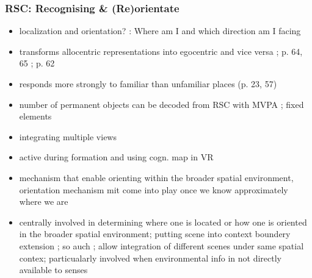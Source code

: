 \documentclass[10pt,a4paper,twocolumn]{article}
\begin{document}
\subsubsection*{RSC: Recognising \& (Re)orientate}
\begin{itemize}
	\item localization and orientation? \citet{epstein_2014_landmark-based_wayfinding}:
	Where am I and which direction am I facing
	\item transforms allocentric representations into egocentric and vice versa
	\citep{vann_2009_what_does_retrospenical_cortex}; p. 64, 65 \citet{epstein_2008_parahippocampal_retrospinal_navigation};
	p. 62 \citet{epstein_2014_landmark-based_wayfinding}
	\item responds more strongly to familiar than unfamiliar places (p. 23,
	57)
	\item number of permanent objects can be decoded from RSC with MVPA \citep{auger_2013_assessing_retrosplenial_navigators};
	fixed elements \citep{marchette_2014_anchoring_neural_compass}
	\item integrating multiple views \citep{park_2010_refreshing_visual_scenes}
	\item active during formation and using cogn. map in VR \citep{iaria_2007_retrosplenial_hippocampal_navigation}
	\item mechanism that enable orienting within the broader spatial environment,
	orientation mechanism mit come into play once we know approximately
	where we are
	\item centrally involved in determining where one is located or how one
	is oriented in the broader spatial environment; putting scene into
	context boundery extension \citep{epstein_2014_landmark-based_wayfinding};
	so auch \citet{galati_2010_reference_frames_spatial_perception};
	allow integration of different scenes under same spatial contex; particualarly
	involved when environmental info in not directly available to senses
\end{itemize}
\end{document}
